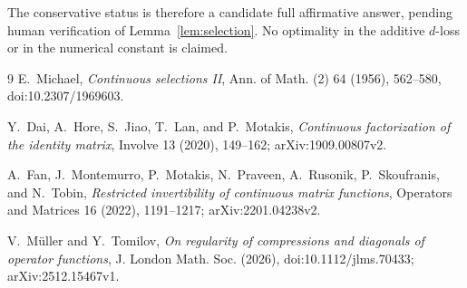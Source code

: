 \documentclass[11pt]{article}
\begin{document}
The conservative status is therefore a candidate full affirmative answer,
pending human verification of Lemma~\ref{lem:selection}.  No optimality in
the additive $d$-loss or in the numerical constant is claimed.

\begin{thebibliography}{9}
E.~Michael,
\emph{Continuous selections II},
Ann. of Math. (2) 64 (1956), 562--580,
doi:10.2307/1969603.

Y.~Dai, A.~Hore, S.~Jiao, T.~Lan, and P.~Motakis,
\emph{Continuous factorization of the identity matrix},
Involve 13 (2020), 149--162; arXiv:1909.00807v2.

A.~Fan, J.~Montemurro, P.~Motakis, N.~Praveen, A.~Rusonik,
P.~Skoufranis, and N.~Tobin,
\emph{Restricted invertibility of continuous matrix functions},
Operators and Matrices 16 (2022), 1191--1217; arXiv:2201.04238v2.

V.~Müller and Y.~Tomilov,
\emph{On regularity of compressions and diagonals of operator functions},
J. London Math. Soc. (2026), doi:10.1112/jlms.70433;
arXiv:2512.15467v1.
\end{thebibliography}
\end{document}

